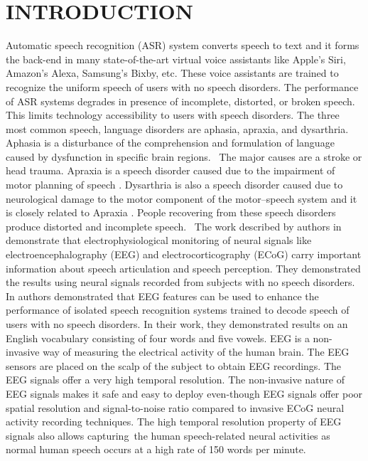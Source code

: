 \documentclass[letterpaper, 10 pt, conference]{ieeeconf}  %
\begin{document}
\section{INTRODUCTION}
Automatic speech recognition (ASR) system converts speech to text and it forms the back-end in many state-of-the-art virtual voice assistants like Apple's Siri, Amazon's Alexa, Samsung's Bixby, etc. These voice assistants are trained to recognize the uniform speech of users with no speech disorders. The performance of ASR systems degrades in presence of incomplete, distorted, or broken speech. This limits technology accessibility to users with speech disorders. The three most common speech, language disorders are aphasia, apraxia, and dysarthria. Aphasia is a disturbance of the comprehension and formulation of language caused by dysfunction in specific brain regions.  The major causes are a stroke or head trauma\cite{damasio1992aphasia,benson1996aphasia}. Apraxia is a speech disorder caused due to the impairment of motor planning of speech \cite{kent1983acoustic}. Dysarthria is also a speech disorder caused due to neurological damage to the motor component of the motor–speech system and it is closely related to Apraxia \cite{darley1969differential}. People recovering from these speech disorders produce distorted and incomplete speech.  The work described by authors in \cite{krishna2020synthesis,anumanchipalli2019speech} demonstrate that electrophysiological monitoring of neural signals like electroencephalography (EEG) and electrocorticography (ECoG) carry important information about speech articulation and speech perception. They demonstrated the results using neural signals recorded from subjects with no speech disorders. In \cite{krishna2019speech} authors demonstrated that EEG features can be used to enhance the performance of isolated speech recognition systems trained to decode speech of users with no speech disorders. In their work, they demonstrated results on an English vocabulary consisting of four words and five vowels. EEG is a non-invasive way of measuring the electrical activity of the human brain. The EEG sensors are placed on the scalp of the subject to obtain EEG recordings. The EEG signals offer a very high temporal resolution. The non-invasive nature of EEG signals makes it safe and easy to deploy even-though EEG signals offer poor spatial resolution and signal-to-noise ratio compared to invasive ECoG neural activity recording techniques. The high temporal resolution property of EEG signals also allows capturing the human speech-related neural activities as normal human speech occurs at a high rate of 150 words per minute. 
\end{document}
